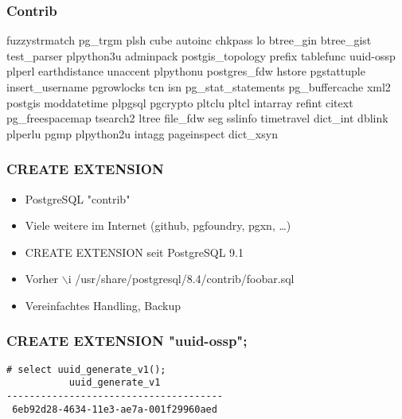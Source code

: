 \documentclass[utf8,hyperref={pdftex,colorlinks,linkcolor=black,citecolor=black,urlcolor=black,filecolor=black,plainpages=false},xcolor=table,hyperref]{beamer}
\begin{document}

%
%
%

\begin{frame}[containsverbatim]
	\frametitle{Contrib}
fuzzystrmatch pg_trgm plsh cube autoinc chkpass lo btree_gin btree_gist
test_parser plpython3u adminpack postgis_topology prefix
tablefunc uuid-ossp plperl earthdistance unaccent plpythonu postgres_fdw hstore
pgstattuple insert_username pgrowlocks tcn isn pg_stat_statements
pg_buffercache xml2 postgis moddatetime plpgsql pgcrypto pltclu pltcl intarray
refint citext pg_freespacemap tsearch2 ltree file_fdw seg sslinfo timetravel
dict_int dblink plperlu pgmp plpython2u intagg pageinspect dict_xsyn
\end{frame}


\begin{frame}
	\frametitle{CREATE EXTENSION}
	\begin{itemize}
		\item PostgreSQL "contrib"
		\item Viele weitere im Internet (github, pgfoundry, pgxn, \dots)
		\item CREATE EXTENSION seit PostgreSQL 9.1
		\item Vorher $\backslash$i /usr/share/postgresql/8.4/contrib/foobar.sql
		\item Vereinfachtes Handling, Backup
	\end{itemize}
\end{frame}


\begin{frame}[containsverbatim]
	\frametitle{CREATE EXTENSION "{}uuid-ossp";}
	\begin{verbatim}
# select uuid_generate_v1();
           uuid_generate_v1           
--------------------------------------
 6eb92d28-4634-11e3-ae7a-001f29960aed
 \end{verbatim}
\end{frame}
\end{document}
